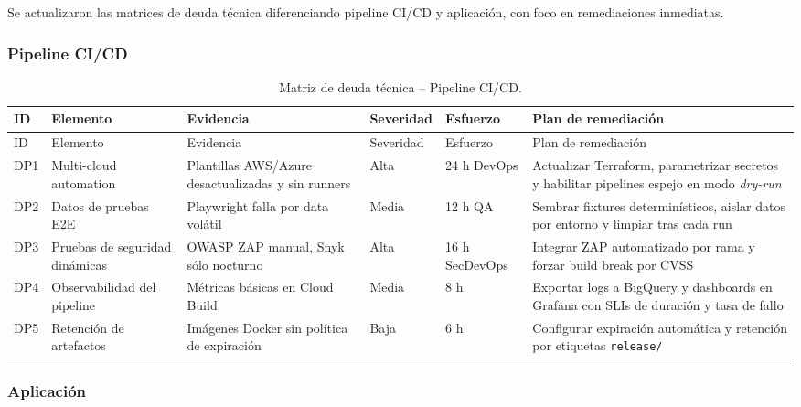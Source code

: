 \documentclass[12pt,a4paper]{article}
\begin{document}
Se actualizaron las matrices de deuda técnica diferenciando pipeline CI/CD y aplicación, con foco en remediaciones inmediatas.

\subsubsection{Pipeline CI/CD}

\begin{longtable}{p{0.9cm} p{3.4cm} p{4.8cm} p{2.6cm} p{2.6cm} p{4.5cm}}
    \caption{Matriz de deuda técnica -- Pipeline CI/CD.}\label{tab:deuda-pipeline-fase3}\\
    \toprule
    ID & Elemento & Evidencia & Severidad & Esfuerzo & Plan de remediación \\
    \midrule
    \endfirsthead
    \toprule
    ID & Elemento & Evidencia & Severidad & Esfuerzo & Plan de remediación \\
    \midrule
    \endhead
    DP1 & Multi-cloud automation & Plantillas AWS/Azure desactualizadas y sin runners & Alta & 24 h DevOps & Actualizar Terraform, parametrizar secretos y habilitar pipelines espejo en modo \emph{dry-run} \\
    DP2 & Datos de pruebas E2E & Playwright falla por data volátil & Media & 12 h QA & Sembrar fixtures determinísticos, aislar datos por entorno y limpiar tras cada run \\
    DP3 & Pruebas de seguridad dinámicas & OWASP ZAP manual, Snyk sólo nocturno & Alta & 16 h SecDevOps & Integrar ZAP automatizado por rama y forzar build break por CVSS \(>7) \\
    DP4 & Observabilidad del pipeline & Métricas básicas en Cloud Build & Media & 8 h & Exportar logs a BigQuery y dashboards en Grafana con SLIs de duración y tasa de fallo \\
    DP5 & Retención de artefactos & Imágenes Docker sin política de expiración & Baja & 6 h & Configurar expiración automática y retención por etiquetas \texttt{release/\*} \\
    \bottomrule
\end{longtable}

\subsubsection{Aplicación}
\end{document}
